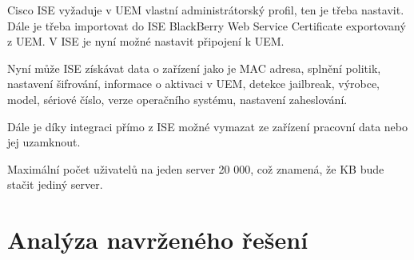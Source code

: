 Cisco ISE vyžaduje v UEM vlastní administrátorský profil, ten je třeba nastavit. Dále je třeba importovat do ISE BlackBerry Web Service Certificate exportovaný z UEM. V ISE je nyní možné nastavit připojení k UEM. 

Nyní může ISE získávat data o zařízení jako je MAC adresa, splnění politik, nastavení šifrování, informace o aktivaci v UEM, detekce jailbreak, výrobce, model, sériové číslo, verze operačního systému, nastavení zaheslování.

Dále je díky integraci přímo z ISE možné vymazat ze zařízení pracovní data nebo jej uzamknout.



Maximální počet uživatelů na jeden server 20 000, což znamená, že KB bude stačit jediný server. 





\section{Analýza navrženého řešení}